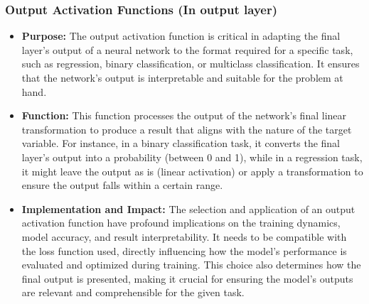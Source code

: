 \documentclass{article}
\begin{document}
\subsubsection{Output Activation Functions (In output layer)}
\begin{itemize}
    \item \textbf{Purpose:} The output activation function is critical in adapting the final layer's output of a neural network to the format required for a specific task, such as regression, binary classification, or multiclass classification. It ensures that the network's output is interpretable and suitable for the problem at hand.
    \item \textbf{Function:} This function processes the output of the network's final linear transformation to produce a result that aligns with the nature of the target variable. For instance, in a binary classification task, it converts the final layer's output into a probability (between 0 and 1), while in a regression task, it might leave the output as is (linear activation) or apply a transformation to ensure the output falls within a certain range.
    \item \textbf{Implementation and Impact:} The selection and application of an output activation function have profound implications on the training dynamics, model accuracy, and result interpretability. It needs to be compatible with the loss function used, directly influencing how the model's performance is evaluated and optimized during training. This choice also determines how the final output is presented, making it crucial for ensuring the model's outputs are relevant and comprehensible for the given task.
\end{itemize}
\end{document}
